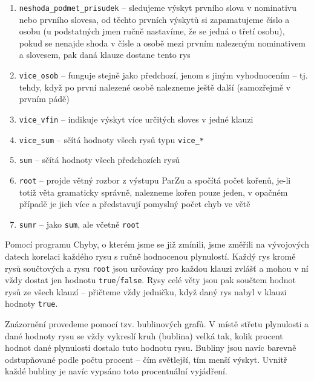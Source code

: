 \documentclass[12pt,a4paper]{report}
\begin{document}
\begin{enumerate}

\item{\texttt{neshoda\_podmet\_prisudek} -- sledujeme výskyt prvního slova v nominativu nebo prvního slovesa, od těchto prvních výskytů si zapamatujeme číslo a osobu (u podstatných jmen ručně nastavíme, že se jedná o třetí osobu), pokud se nenajde shoda v čísle a osobě mezi prvním nalezeným nominativem a slovesem, pak daná klauze dostane tento rys}
\item{\texttt{vice\_osob} -- funguje stejně jako předchozí, jenom s jiným vyhodnocením -- tj. tehdy, když po první nalezené osobě nalezneme ještě další (samozřejmě v prvním pádě)}
\item{\texttt{vice\_vfin} -- indikuje výskyt více určitých sloves v jedné klauzi}
\item{\texttt{vice\_sum} -- sčítá hodnoty všech rysů typu \texttt{vice\_*}}
\item{\texttt{sum} -- sčítá hodnoty všech předchozích rysů}
\item{\texttt{root} -- projde větný rozbor z výstupu ParZu a spočítá počet kořenů, je-li totiž věta gramaticky správně, nalezneme kořen pouze jeden, v opačném případě je jich více a představují pomyslný počet chyb ve větě}
\item{\texttt{sumr} -- jako \texttt{sum}, ale včetně \texttt{root}}
\end{enumerate}

Pomocí programu Chyby, o kterém jsme se již zmínili, jsme změřili na vývojových datech korelaci každého rysu s ručně hodnocenou plynulostí. Každý rys kromě rysů součtových a rysu \texttt{root} jsou určovány pro každou klauzi zvlášť a mohou v ní vždy dostat jen hodnotu \texttt{true}/\texttt{false}. Rysy celé věty jsou pak součtem hodnot rysů ze všech klauzí -- přičteme vždy jedničku, když daný rys nabyl v klauzi hodnoty \texttt{true}.

Znázornění provedeme pomocí tzv. bublinových grafů. V místě střetu plynulosti a dané hodnoty rysu se vždy vykreslí kruh (bublina) velká tak, kolik procent hodnot dané plynulosti dostalo tuto hodnotu rysu. Bubliny jsou navíc barevně odstupňované podle počtu procent -- čím světlejší, tím menší výskyt. Uvnitř každé bubliny je navíc vypsáno toto procentuální vyjádření.
\end{document}
